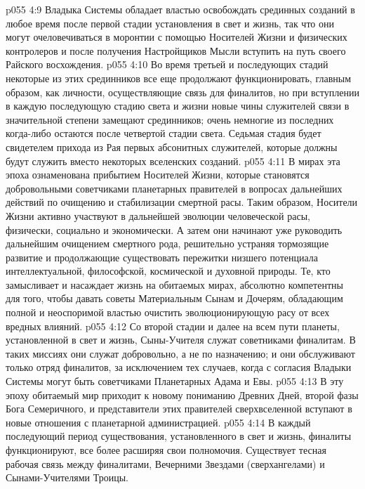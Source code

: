 \vs p055 4:9 Владыка Системы обладает властью освобождать срединных созданий в любое время после первой стадии установления в свет и жизнь, так что они могут очеловечиваться в моронтии с помощью Носителей Жизни и физических контролеров и после получения Настройщиков Мысли вступить на путь своего Райского восхождения.
\vs p055 4:10 Во время третьей и последующих стадий некоторые из этих срединников все еще продолжают функционировать, главным образом, как личности, осуществляющие связь для финалитов, но при вступлении в каждую последующую стадию света и жизни новые чины служителей связи в значительной степени замещают срединников; очень немногие из последних когда\hyp{}либо остаются после четвертой стадии света. Седьмая стадия будет свидетелем прихода из Рая первых абсонитных служителей, которые должны будут служить вместо некоторых вселенских созданий.
\vs p055 4:11 \bibnobreakspace {} В мирах эта эпоха ознаменована прибытием Носителей Жизни, которые становятся добровольными советчиками планетарных правителей в вопросах дальнейших действий по очищению и стабилизации смертной расы. Таким образом, Носители Жизни активно участвуют в дальнейшей эволюции человеческой расы, физически, социально и экономически. А затем они начинают уже руководить дальнейшим очищением смертного рода, решительно устраняя тормозящие развитие и продолжающие существовать пережитки низшего потенциала интеллектуальной, философской, космической и духовной природы. Те, кто замысливает и насаждает жизнь на обитаемых мирах, абсолютно компетентны для того, чтобы давать советы Материальным Сынам и Дочерям, обладающим полной и неоспоримой властью очистить эволюционирующую расу от всех вредных влияний.
\vs p055 4:12 Со второй стадии и далее на всем пути планеты, установленной в свет и жизнь, Сыны\hyp{}Учителя служат советниками финалитам. В таких миссиях они служат добровольно, а не по назначению; и они обслуживают только отряд финалитов, за исключением тех случаев, когда с согласия Владыки Системы могут быть советчиками Планетарных Адама и Евы.
\vs p055 4:13 \bibnobreakspace {} В эту эпоху обитаемый мир приходит к новому пониманию Древних Дней, второй фазы Бога Семеричного, и представители этих правителей сверхвселенной вступают в новые отношения с планетарной администрацией.
\vs p055 4:14 В каждый последующий период существования, установленного в свет и жизнь, финалиты функционируют, все более расширяя свои полномочия. Существует тесная рабочая связь между финалитами, Вечерними Звездами (сверхангелами) и Сынами\hyp{}Учителями Троицы.
